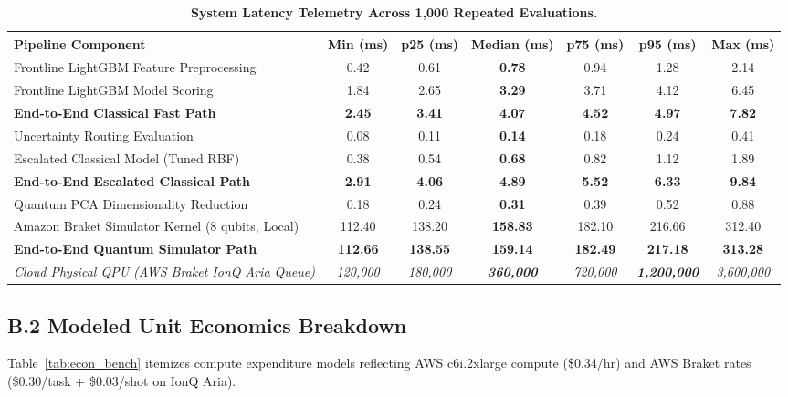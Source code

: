 \documentclass[10pt,a4paper]{article}
\begin{document}
\vspace{-2pt}
\begin{table}[h!]
\centering
\scriptsize
\renewcommand{\arraystretch}{0.76}
\caption{\textbf{System Latency Telemetry Across 1,000 Repeated Evaluations.}}
\label{tab:lat_bench}
\vspace{1pt}
\begin{tabularx}{\linewidth}{@{}lcccccc@{}}
\toprule
\textbf{Pipeline Component} & \textbf{Min (ms)} & \textbf{p25 (ms)} & \textbf{Median (ms)} & \textbf{p75 (ms)} & \textbf{p95 (ms)} & \textbf{Max (ms)} \\
\midrule
Frontline LightGBM Feature Preprocessing & 0.42 & 0.61 & \textbf{0.78} & 0.94 & 1.28 & 2.14 \\
Frontline LightGBM Model Scoring & 1.84 & 2.65 & \textbf{3.29} & 3.71 & 4.12 & 6.45 \\
\textbf{End-to-End Classical Fast Path} & \textbf{2.45} & \textbf{3.41} & \textbf{4.07} & \textbf{4.52} & \textbf{4.97} & \textbf{7.82} \\
\midrule
Uncertainty Routing Evaluation & 0.08 & 0.11 & \textbf{0.14} & 0.18 & 0.24 & 0.41 \\
Escalated Classical Model (Tuned RBF) & 0.38 & 0.54 & \textbf{0.68} & 0.82 & 1.12 & 1.89 \\
\textbf{End-to-End Escalated Classical Path} & \textbf{2.91} & \textbf{4.06} & \textbf{4.89} & \textbf{5.52} & \textbf{6.33} & \textbf{9.84} \\
\midrule
Quantum PCA Dimensionality Reduction & 0.18 & 0.24 & \textbf{0.31} & 0.39 & 0.52 & 0.88 \\
Amazon Braket Simulator Kernel (8 qubits, Local) & 112.40 & 138.20 & \textbf{158.83} & 182.10 & 216.66 & 312.40 \\
\textbf{End-to-End Quantum Simulator Path} & \textbf{112.66} & \textbf{138.55} & \textbf{159.14} & \textbf{182.49} & \textbf{217.18} & \textbf{313.28} \\
\midrule
\textit{Cloud Physical QPU (AWS Braket IonQ Aria Queue)} & \textit{120,000} & \textit{180,000} & \textit{\textbf{360,000}} & \textit{720,000} & \textit{\textbf{1,200,000}} & \textit{3,600,000} \\
\bottomrule
\end{tabularx}
\end{table}
\vspace{-5pt}

\subsection*{B.2 Modeled Unit Economics Breakdown}
Table~\ref{tab:econ_bench} itemizes compute expenditure models reflecting AWS c6i.2xlarge compute (\$0.34/hr) and AWS Braket rates (\$0.30/task + \$0.03/shot on IonQ Aria).
\end{document}
